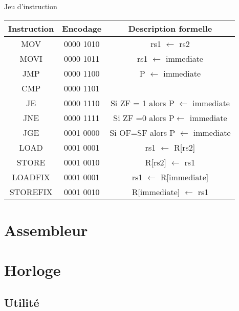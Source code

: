 \documentclass{beamer}
\begin{document}
    \begin{frame}{Jeu d'instruction}

        \begin{center}
        \begin{tabular}{| c || c | c |}
            Instruction & Encodage & Description formelle \\ \hline
            MOV   & 0000 1010 & rs1 $\gets$ rs2\\ \hline
            MOVI  & 0000 1011 & rs1 $\gets$ immediate\\\hline
            JMP   & 0000 1100 & P $\gets$ immediate\\ \hline
            CMP   & 0000 1101 & \\ \hline
            JE    & 0000 1110 &  Si ZF = 1 alors P $\gets$ immediate \\ \hline
            JNE   & 0000 1111 & Si ZF =0 alors P$\gets$ immediate\\ \hline
            JGE   & 0001 0000 & Si OF=SF alors P $\gets$ immediate\\ \hline
            LOAD  & 0001 0001 & rs1 $\gets$ R[rs2]\\ \hline
            STORE & 0001 0010 & R[rs2] $\gets$ rs1\\ \hline
            LOADFIX  & 0001 0001 & rs1 $\gets$ R[immediate]\\ \hline
            STOREFIX & 0001 0010 & R[immediate] $\gets$ rs1\\ \hline
        \end{tabular}
    \end{center}

    \end{frame}

\section{Assembleur}
    \begin{frame}
    \end{frame}
\section{Horloge}
    \begin{frame}
    \end{frame}

\subsection{Utilité}
\end{document}
